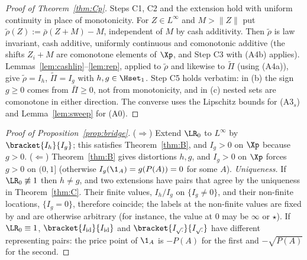 \begin{proof}[Proof of Theorem~\ref{thm:Cp}]
Steps C1, C2 and the extension hold with uniform continuity in place of monotonicity. For $Z\in L^\infty$ and
$M>\|Z\|$ put $\tilde\rho(Z):=\bar\rho(Z+M)-M$, independent of $M$ by cash additivity. Then $\tilde\rho$ is law
invariant, cash additive, uniformly continuous and comonotonic additive (the shifts $Z_i+M$ are comonotone elements
of $\Xp$, and Step C3 with (A4b) applies). Lemmas~\ref{lem:cashlip}--\ref{lem:rep}, applied to $\tilde\rho$ and
likewise to $\tilde\Pi$ (using (A4a)), give $\tilde\rho=I_h$, $\tilde\Pi=I_g$ with $h,g\in\Hset_1$. Step C5 holds
verbatim: in (b) the sign $g\ge0$ comes from $\bar\Pi\ge0$, not from monotonicity, and in (c) nested sets are
comonotone in either direction. The converse uses the Lipschitz bounds for (A3$_s$) and Lemma~\ref{lem:sweep} for
(A0). \qedhere
\end{proof}

\begin{proof}[Proof of Proposition~\ref{prop:bridge}]
($\Rightarrow$) Extend $\LR_0$ to $L^\infty$ by $\bracket{I_h}{I_g}$; this satisfies Theorem~\ref{thm:B}, and
$I_g>0$ on $\Xp$ because $g>0$. ($\Leftarrow$) Theorem~\ref{thm:B} gives distortions $h,g$, and $I_g>0$ on $\Xp$
forces $g>0$ on $(0,1]$ (otherwise $I_g(\1_A)=g(P(A))=0$ for some $A$). \emph{Uniqueness.} If $\LR_0\not\equiv1$ then
$h\ne g$, and two extensions have pairs that agree by the uniqueness in Theorem~\ref{thm:C}. Their finite values,
$I_h/I_g$ on $\{I_g\ne0\}$, and their non-finite locations, $\{I_g=0\}$, therefore coincide; the labels at the
non-finite values are fixed by  and are otherwise arbitrary (for instance, the value at $0$ may be $\infty$ or
$\star$). If $\LR_0\equiv1$, $\bracket{I_{\mathrm{id}}}{I_{\mathrm{id}}}$ and $\bracket{I_{\sqrt\cdot}}{I_{\sqrt\cdot}}$ have
different representing pairs: the price point of $\1_A$ is $-P(A)$ for the first and $-\sqrt{P(A)}$ for the second. \qedhere
\end{proof}
